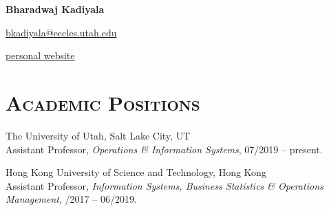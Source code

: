 \documentclass[11pt]{article}
\begin{document}
	\noindent \textbf{\LARGE Bharadwaj Kadiyala}

	\vspace{1em}

	  \hfill  \href{mailto:bkadiyala@eccles.utah.edu}{bkadiyala@eccles.utah.edu}

	   {\hfill \href{https://b-kadiyala.github.io}{personal website}}



	\section*{{\textsc{Academic Positions}}}
	\begin{description}
			\item 	The University of Utah, Salt Lake City, UT\\ Assistant Professor, \textit{Operations \& Information Systems}, 07/2019 -- present.

			\item Hong Kong University of Science and Technology, Hong Kong \\ Assistant Professor,  \textit{Information Systems, Business Statistics \& Operations Management}, /2017 --  06/2019.

	\end{description}


\end{document}
